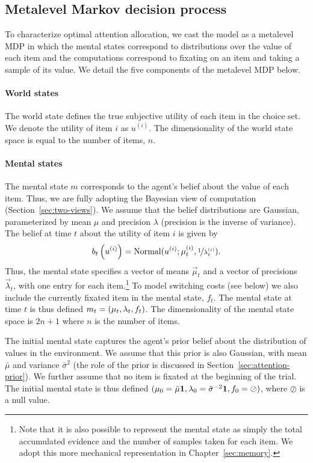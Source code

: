 \subsection{Metalevel Markov decision process}\label{sec:attention-mdp}

To characterize optimal attention allocation, we cast the model as a metalevel MDP in which the mental states correspond to distributions over the value of each item and the computations correspond to fixating on an item and taking a sample of its value. We detail the five components of the metalevel MDP below.

\paragraph{World states}
The world state defines the true subjective utility of each item in the choice set. We denote the utility of item $i$ as $u^{(i)}$. The dimensionality of the  world state space is equal to the number of items, $n$.

\paragraph{Mental states}
The mental state $m$ corresponds to the agent's belief about the value of each item. Thus, we are fully adopting the Bayesian view of computation (Section~\ref{sec:two-views}). We assume that the belief distributions are Gaussian, parameterized by mean $\mu$ and precision $\lambda$ (precision is the inverse of variance). The belief at time $t$ about the utility of item $i$ is given by
\begin{equation}
  b_t\left(u^{(i)}\right) = \mathrm{Normal}(u^{(i)}; \mu_t^{(i)}, \nicefrac{1}{\lambda_t^{(i)}}).
\end{equation}
Thus, the mental state specifies a vector of means $\vec{\mu}_t$ and a vector of precisions $\vec{\lambda}_t$, with one entry for each item.\footnote{%
  Note that it is also possible to represent the mental state as simply the total accumulated evidence and the number of samples taken for each item. We adopt this more mechanical representation in Chapter~\ref{sec:memory}.
} To model switching costs (see below) we also include the currently fixated item in the mental state, $f_t$. The mental state at time $t$ is thus defined $m_t = (\mathbf{\mu}_t, \mathbf{\lambda}_t, f_t)$. The dimensionality of the mental state space is $2n + 1$ where $n$ is the number of items.

The initial mental state captures the agent's prior belief about the distribution of values in the environment. We assume that this prior is also Gaussian, with mean $\bar{\mu}$ and variance $\bar{\sigma}^2$ (the role of the prior is discussed in Section~\ref{sec:attention-prior}). We further assume that no item is fixated at the beginning of the trial. The initial mental state is thus defined $(\mathbf{\mu}_0 = \bar{\mu}\textbf{1}, \mathbf{\lambda}_0 = \bar{\sigma}^{-2}\textbf{1}, f_0 = \oslash)$, where $\oslash$ is a null value.

